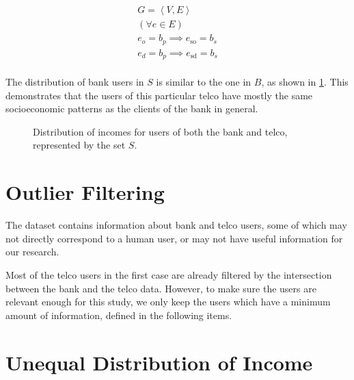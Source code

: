 \begin{equation}
\label{eq:banktelcojoin}
\begin{gathered}
G = \left< V, E \right> \\
( \forall e \in E ) \\
e_o = b_p \implies e_{\operatorname{so}} = b_s \\
e_d = b_p \implies e_{\operatorname{sd}} = b_s \\
\end{gathered}
\end{equation}

The distribution of bank users in $S$ is similar to the one in $B$, as shown in \cref{fig:matchdistribution}. This demonstrates that the users of this particular telco have mostly the same socioeconomic patterns as the clients of the bank in general.

\begin{figure}
\centering
{}
\caption{Distribution of incomes for users of both the bank and telco, represented by the set $S$.}
\label{fig:matchdistribution}
\end{figure}

\section{Outlier Filtering}
\label{subsec:outlier_filtering}

The dataset contains information about bank and telco users, some of which may not directly correspond to a human user, or may not have useful information for our research.

Most of the telco users in the first case are already filtered by the intersection between the bank and the telco data. However, to make sure the users are relevant enough for this study, we only keep the users which have a minimum amount of information, defined in the following items.


\section{Unequal Distribution of Income}

